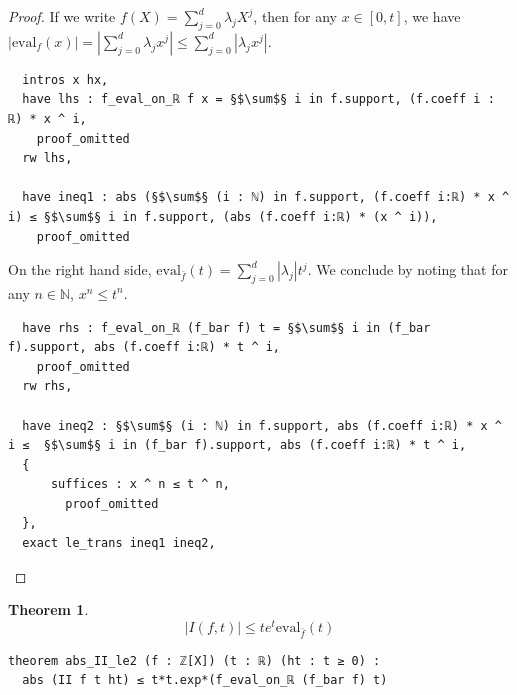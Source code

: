 \documentclass{report}
\theoremstyle{definition}
\newtheorem{theorem}{Theorem}[section]
\begin{document}
\begin{proof}
If we write $f(X)=\sum_{j=0}^d\lambda_j X^j$, then for any $x\in[0,t]$, we have $\left|\mathrm{eval}_f(x)\right|=\left|\sum_{j=0}^d\lambda_j x^j\right|\le \sum_{j=0}^d\left|\lambda_j x^j\right|$.
\begin{verbatim}
  intros x hx,
  have lhs : f_eval_on_ℝ f x = §$\sum$§ i in f.support, (f.coeff i : ℝ) * x ^ i,
    proof_omitted
  rw lhs,
  
  have ineq1 : abs (§$\sum$§ (i : ℕ) in f.support, (f.coeff i:ℝ) * x ^ i) ≤ §$\sum$§ i in f.support, (abs (f.coeff i:ℝ) * (x ^ i)),
    proof_omitted
\end{verbatim}

On the right hand side, $\mathrm{eval}_{\bar f}(t)=\sum_{j=0}^d \left|\lambda_j\right|t^j$. We conclude by noting that for any $n\in\mathbb N$, $x^n\le t^n$.

\begin{verbatim}
  have rhs : f_eval_on_ℝ (f_bar f) t = §$\sum$§ i in (f_bar f).support, abs (f.coeff i:ℝ) * t ^ i,
    proof_omitted
  rw rhs,

  have ineq2 : §$\sum$§ (i : ℕ) in f.support, abs (f.coeff i:ℝ) * x ^ i ≤  §$\sum$§ i in (f_bar f).support, abs (f.coeff i:ℝ) * t ^ i,
  {
      suffices : x ^ n ≤ t ^ n,
        proof_omitted
  },
  exact le_trans ineq1 ineq2,  
\end{verbatim}
\end{proof}

\begin{theorem}\label{lemma:Iupperbound}
$$\left|I(f, t)\right|\le t e^t\mathrm{eval}_{\bar f}(t)$$
\begin{verbatim}
theorem abs_II_le2 (f : ℤ[X]) (t : ℝ) (ht : t ≥ 0) : 
  abs (II f t ht) ≤ t*t.exp*(f_eval_on_ℝ (f_bar f) t)
\end{verbatim}
\end{theorem}
\end{document}
